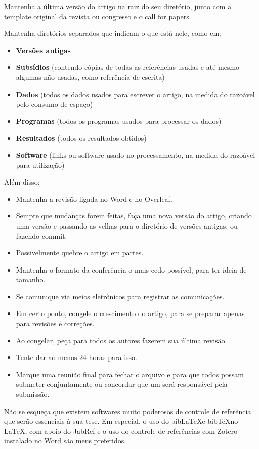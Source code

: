 Mantenha a última versão do artigo na raiz do seu diretório, junto com a template original da revista ou congresso e o call for papers.

Mantenha diretórios separados que indicam o que está nele, como em:
\begin{itemize}
  \item \textbf{Versões antigas}
  \item \textbf{Subsídios} (contendo cópias de todas as referências usadas e até mesmo algumas não usadas, como referência de escrita)
  \item \textbf{Dados} (todos os dados usados para escrever o artigo, na medida do razoável pelo consumo de espaço)
  \item \textbf{Programas} (todos os programas usados para processar os dados)
  \item \textbf{Resultados} (todos os resultados obtidos)
  \item \textbf{Software} (links ou software usado no processamento, na medida do razoável para utilização)
\end{itemize}

Além disso: 

\begin{itemize}
  \item Mantenha a revisão ligada no Word e no Overleaf.
  \item Sempre que mudanças forem feitas, faça uma nova versão do artigo, criando uma versão e passando as velhas para o diretório de versões antigas, ou fazendo commit.
  \item Possivelmente quebre o artigo em partes.
  \item Mantenha o formato da conferência o mais cedo possível, para ter ideia de tamanho.
  \item Se comunique via meios eletrônicos para registrar as comunicações. 
  \item Em certo ponto, congele o crescimento do artigo, para se preparar apenas para revisões e correções. 
  \item Ao congelar, peça para todos os autores fazerem sua última revisão. 
  \item Tente dar ao menos 24 horas para isso.
  \item Marque uma reunião final para fechar o arquivo e para que todos possam submeter conjuntamente ou concordar que um será responsável pela submissão.
\end{itemize}

Não se esqueça que existem softwares muito poderosos de controle de referência que serão essenciais à sua tese. Em especial, o uso do bib\LaTeX e bib\TeX no \LaTeX, com apoio do JabRef e o uso do controle de referências com Zotero instalado no Word são meus preferidos.


